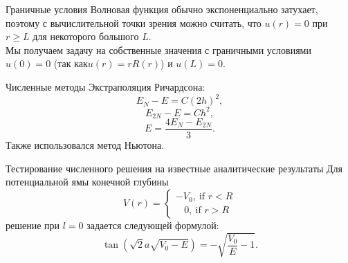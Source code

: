 \documentclass{beamer}
\begin{document}
\begin{frame}{Граничные условия}
	 Волновая функция обычно экспоненциально затухает, поэтому с вычислительной точки зрения можно считать, что $u (r) = 0$ при $ r \geq L$ для некоторого большого $L$.\\
	Мы получаем задачу на собственные значения с граничными условиями $u (0) = 0$ (так как$ u (r) = r R (r)$) и $u (L) = 0$.
\end{frame}


\begin{frame}{Численные методы}
Экстраполяция Ричардсона: \vskip 2mm
$$E_{N} - E = C (2h)^2,$$
$$E_{2N} - E = C h^2,$$
\vskip 2mm
 $$E = \frac{4 E_N - E_{2N}}{3}.$$
 \vskip 2mm
 Также использовался метод Ньютона.
  
\end{frame}

\begin{frame}{Тестирование численного решения на известные аналитические результаты}
  Для потенциальной ямы конечной глубины $$V(r)=\begin{cases}
-V_0, ~\text{if } r< R\\
~~~~0, ~\text{if } r>R
\end{cases}$$
решение при $l = 0$ задается следующей формулой: 
$$\tan(\sqrt{2} a \sqrt{V_0-E})=-\sqrt{\frac{V_0}{E}-1}.$$ 
\end{frame}
\end{document}
